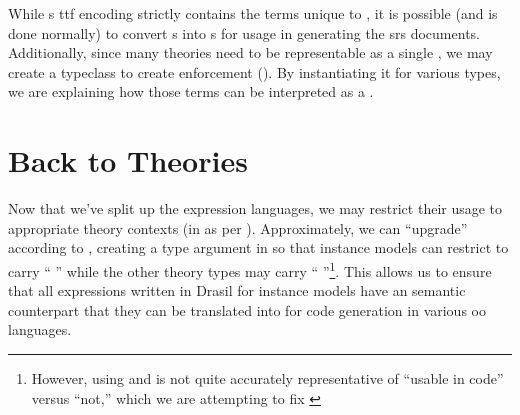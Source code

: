 While \ModelExpr{}s \acs{ttf} encoding strictly contains the terms unique to
\ModelExpr{}, it is possible (and is done normally) to convert \Expr{}s into
\ModelExpr{}s for usage in generating the \acs{srs} documents. Additionally,
since many theories need to be representable as a single \Relation{}, we may
create a typeclass to create enforcement (). By
instantiating it for various types, we are explaining how those terms can be
interpreted as a \ModelExpr{}.

\currentExpressHaskell{}
 
\section{Back to Theories}
\label{chap:lang-division:sec:back-to-theories}

Now that we've split up the expression languages, we may restrict their usage to
appropriate theory contexts (in \ModelKinds{} as per ).
Approximately, we can ``upgrade'' \ModelKinds according to
, creating a type argument in \ModelKinds{}
so that instance models can restrict to carry ``\ModelKinds{} \Expr{}'' while
the other theory types may carry ``\ModelKinds{}
\ModelExpr{}''\footnote{However, using \Expr{} and \ModelExpr{} is not quite
accurately representative of ``usable in code'' versus ``not,'' which we are
attempting to fix \cite{DrasilIssue2853AlternativeModelKinds}}. This allows us
to ensure that all expressions written in Drasil for instance models have an
semantic counterpart that they can be translated into for code generation in
various \acs{oo} languages.

\pseudoPartialModelKindsUpgrade{}
